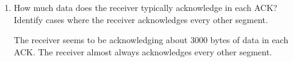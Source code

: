 \documentclass[12pt]{article}
\begin{document}
\begin{enumerate}[label=Q\arabic*:, resume]
    \item How much data does the receiver typically acknowledge in each ACK?
          Identify cases where the receiver acknowledges every other segment.

          The receiver seems to be acknowledging about 3000 bytes of data in each ACK.
          The receiver almost always acknowledges every other segment.

\end{enumerate}
\end{document}
